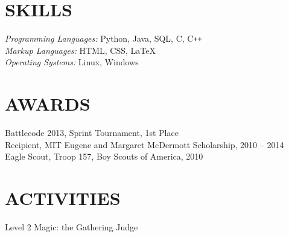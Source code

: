 \documentclass[margin]{res}
\begin{document}
\begin{resume}
\section{SKILLS}    {\sl Programming Languages:} Python, Java, SQL, C,
                      C\texttt{++} \\
                    {\sl Markup Languages:} HTML, CSS, \LaTeX \\
                    {\sl Operating Systems:} Linux, Windows
 
 
\section{AWARDS}    Battlecode 2013, Sprint Tournament, 1st Place\\
                    Recipient, MIT Eugene and Margaret McDermott Scholarship, 
                    2010 -- 2014\\
                    Eagle Scout, Troop 157, Boy Scouts of America, 2010

\section{ACTIVITIES}
                    Level 2 Magic: the Gathering Judge

\end{resume}
\end{document}
